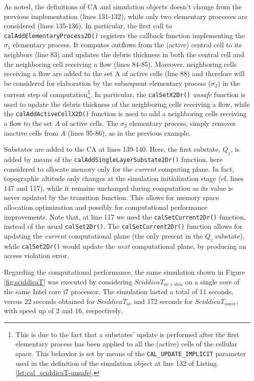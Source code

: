 As noted, the definitions of CA and simulation objects doesn't
change from the previous implementation (lines 131-132), while only
two elementary processes are considered (lines 135-136). In
particular, the first call to \verb'calAddElementaryProcess2D()'
registers the callback function implementing the $\sigma_1$ elementary
process. It computes outflows from the (active) central cell to its
neighbors (line 83) and updates the debris thickness in both the
central cell and the neighboring cell receiving a flow (lines
84-85). Moreover, neighboring cells receiving a flow are added to the
set A of active cells (line 88) and therefore will be considered for
elaboration by the subsequent elementary process ($\sigma_2$) in the
current step of computation\footnote{This is due to the fact that a
  substates' update is performed after the first elementary process
  has been applied to all the (active) cells of the cellular
  space. This behavior is set by means of the
  \texttt{CAL\_UPDATE\_IMPLICIT} parameter used in the definition of
  the simulation object at line 132 of Listing
  \ref{lst:cal_sciddicaT-unsafe}.}. In particular, the
\verb'calSetX2Dr()' \emph{unsafe} function is used to update the
debris thickness of the neighboring cells receiving a flow, while the
\verb'calAddActiveCellX2D()' function is used to add a neighboring
cells receiving a flow to the set $A$ of active cells.  The $\sigma_2$
elementary process, simply removes inactive cells from $A$ (lines
95-86), as in the previous example.


Substates are added to the CA at lines 139-140. Here, the first
substate, $Q_z$, is added by means of the
\verb'calAddSingleLayerSubstate2Dr()' function, here considered
to allocate memory only for the \emph{current} computing plane. In
fact, topographic altitude only changes at the simulation
initialization stage (cf. lines 147 and 117), while it remains
unchanged during computation as its value is never updated by the
transition function. This allows for memory space allocation
optimization and possibly for computational performance
improvements. Note that, at line 117 we used the
\verb'calSetCurrent2Dr()' function, instead of the usual
\verb'calSet2Dr()'. The \verb'calSetCurrent2Dr()' function allows for
updating the \emph{current} computational plane (the only present in
the $Q_z$ substate), while \verb'calSet2Dr()' would update the
\emph{next} computational plane, by producing an access violation
error.

Regarding the computational performance, the same simulation shown in
Figure \ref{fig:sciddicaT} was executed by considering
$SciddicaT_{ac+dnu}$ on a single core of the same Intel core i7
processor. The simulation lasted a total of 11 seconds, versus 22
seconds obtained for $SciddicaT_{ac}$ and 172 seconds for
$SciddicaT_{naive}$, with speed up of 2 and 16, respectively.

